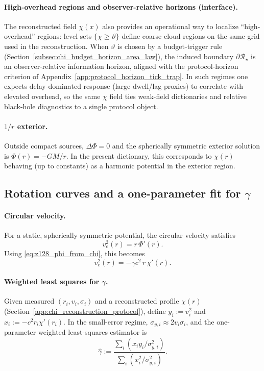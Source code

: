 \paragraph{High-overhead regions and observer-relative horizons (interface).}
\InterfaceTag The reconstructed field $\chi(x)$ also provides an operational way to localize ``high-overhead'' regions: level sets $\{\chi\ge \vartheta\}$ define coarse cloud regions on the same grid used in the reconstruction.
When $\vartheta$ is chosen by a budget-trigger rule (Section~\ref{subsec:chi_budget_horizon_area_law}), the induced boundary $\partial\mathcal R_\star$ is an observer-relative information horizon, aligned with the protocol-horizon criterion of Appendix~\ref{app:protocol_horizon_tick_trap}.
In such regimes one expects delay-dominated response (large dwell/lag proxies) to correlate with elevated overhead, so the same $\chi$ field ties weak-field dictionaries and relative black-hole diagnostics to a single protocol object.

\paragraph{\texorpdfstring{$1/r$}{1/r} exterior.}
\InterfaceTag Outside compact sources, $\Delta\Phi=0$ and the spherically symmetric exterior solution is $\Phi(r)=-GM/r$.
In the present dictionary, this corresponds to $\chi(r)$ behaving (up to constants) as a harmonic potential in the exterior region.

\subsection{Rotation curves and a one-parameter fit for \texorpdfstring{$\gamma$}{gamma}}
\label{subsec:z128_gamma_fit}

\paragraph{Circular velocity.}
For a static, spherically symmetric potential, the circular velocity satisfies
\[
v_c^2(r)=r\,\Phi'(r).
\]
Using \eqref{eq:z128_phi_from_chi}, this becomes
\begin{equation}
\label{eq:z128_vc_from_chi}
v_c^2(r)=-\gamma c^2\,r\,\chi'(r).
\end{equation}

\paragraph{Weighted least squares for \texorpdfstring{$\gamma$}{gamma}.}
\InterfaceTag Given measured $(r_i,v_i,\sigma_i)$ and a reconstructed profile $\chi(r)$ (Section~\ref{app:chi_reconstruction_protocol}),
define $y_i:=v_i^2$ and $x_i:=-c^2 r_i\chi'(r_i)$.
In the small-error regime, $\sigma_{y,i}\approx 2v_i\sigma_i$, and the one-parameter weighted least-squares estimator is
\[
\widehat\gamma
:=\frac{\sum_i (x_i y_i/\sigma_{y,i}^2)}{\sum_i (x_i^2/\sigma_{y,i}^2)}.
\]

